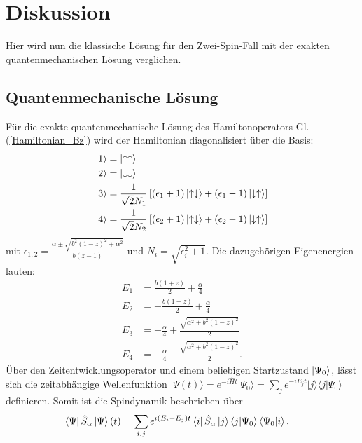 \chapter{Diskussion}
Hier wird nun die klassische Lösung für den Zwei-Spin-Fall mit der exakten quantenmechanischen Lösung verglichen.
\section{Quantenmechanische Lösung}
Für die exakte quantenmechanische Lösung des Hamiltonoperators Gl. (\ref{Hamiltonian_Bz}) wird der Hamiltonian diagonalisiert über die Basis:
\begin{align}
    \ket{1} &= \ket{\uparrow\uparrow}   \\
    \ket{2} &= \ket{\downarrow\downarrow} \\
    \ket{3} &= \frac{1}{\sqrt{2}N_1}\left[(\epsilon_1+1)\ket{\uparrow\downarrow} +(\epsilon_1-1)\ket{\downarrow\uparrow} \right]\\
    \ket{4} &= \frac{1}{\sqrt{2}N_2}\left[(\epsilon_2+1)\ket{\uparrow\downarrow} +(\epsilon_2-1)\ket{\downarrow\uparrow} \right]
\end{align}
mit $\epsilon_{1,2} = \frac{\alpha \pm \sqrt{b^2(1-z)^2+\alpha^2} }{b(z-1)} $ und $N_{i} = \sqrt{\epsilon_i^2 + 1}$. Die dazugehörigen Eigenenergien lauten:
\begin{align}
    E_1 &= \frac{b(1+z)}{2} + \frac{\alpha}{4}\\
    E_2 &= -\frac{b(1+z)}{2} + \frac{\alpha}{4}\\
    E_3 &= -\frac{\alpha}{4} + \frac{\sqrt{\alpha^2 + b^2(1-z)^2}}{2}\\
    E_4 &= -\frac{\alpha}{4} - \frac{\sqrt{\alpha^2 + b^2(1-z)^2}}{2}.
\end{align}
\noindent Über den Zeitentwicklungsoperator und einem beliebigen Startzustand $\ket{\Psi_0}$, lässt sich die zeitabhängige Wellenfunktion 
$|\Psi(t)\rangle = e^{-i\hat{H}t}|\Psi_0\rangle = \sum_j e^{-i E_j t}|j\rangle\langle j|\Psi_0\rangle$ definieren. Somit ist die Spindynamik
beschrieben über
\begin{align}
    \bra{\Psi}\hat{S}_\alpha\ket{\Psi}(t) &= \sum_{i,j}e^{i(E_i-E_j)t}\bra{i}\hat{S}_\alpha\ket{j}\bra{j}\ket{\Psi_0}\bra{\Psi_0}\ket{i}.
\end{align}
